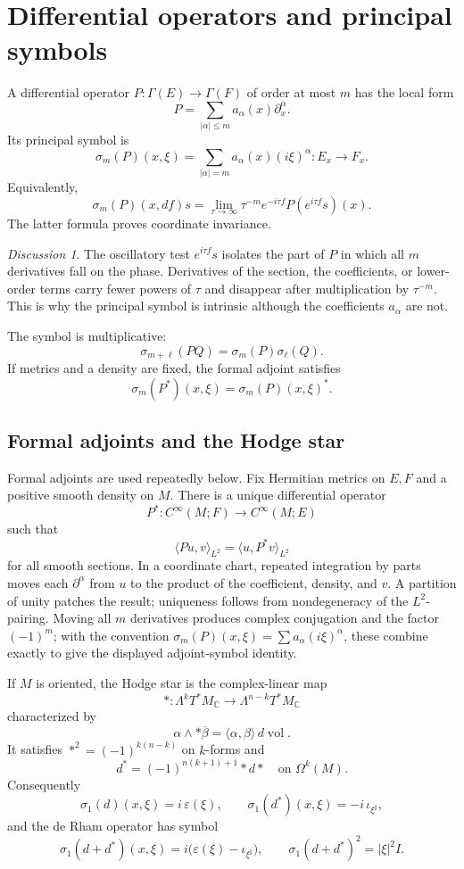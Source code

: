 \documentclass[11pt,oneside,reqno]{book}
\theoremstyle{plain}
\theoremstyle{definition}
\theoremstyle{remark}
\newtheorem*{discussion}{Discussion}
\begin{document}
\section{Differential operators and principal symbols}

A differential operator \(P:\Gamma(E)\to\Gamma(F)\) of order at most \(m\)
has the local form
\[
 P=\sum_{|\alpha|\leq m}a_\alpha(x)\partial_x^\alpha.
\]
Its principal symbol is
\[
 \sigma_m(P)(x,\xi)
 =
 \sum_{|\alpha|=m}a_\alpha(x)(i\xi)^\alpha:
 E_x\longrightarrow F_x.
\]
Equivalently,
\[
 \sigma_m(P)(x,df)s
 =
 \lim_{\tau\to\infty}
 \tau^{-m}e^{-i\tau f}P(e^{i\tau f}s)(x).
\]
The latter formula proves coordinate invariance.

\begin{discussion}
The oscillatory test \(e^{i\tau f}s\) isolates the part of \(P\) in which
all \(m\) derivatives fall on the phase. Derivatives of the section, the
coefficients, or lower-order terms carry fewer powers of \(\tau\) and
disappear after multiplication by \(\tau^{-m}\). This is why the principal
symbol is intrinsic although the coefficients \(a_\alpha\) are not.
\end{discussion}

The symbol is multiplicative:
\[
 \sigma_{m+\ell}(PQ)
 =
 \sigma_m(P)\sigma_\ell(Q).
\]
If metrics and a density are fixed, the formal adjoint satisfies
\[
 \sigma_m(P^*)(x,\xi)=\sigma_m(P)(x,\xi)^*.
\]

\subsection*{Formal adjoints and the Hodge star}

Formal adjoints are used repeatedly below.  Fix
Hermitian metrics on \(E,F\) and a positive smooth density on \(M\).
There is a unique differential operator
\[
 P^*:C^\infty(M;F)\longrightarrow C^\infty(M;E)
\]
such that
\[
 \langle Pu,v\rangle_{L^2}=\langle u,P^*v\rangle_{L^2}
\]
for all smooth sections.  In a coordinate chart, repeated integration by
parts moves each \(\partial^\alpha\) from \(u\) to the product of the
coefficient, density, and \(v\).  A partition of unity patches the result;
uniqueness follows from nondegeneracy of the \(L^2\)-pairing.  Moving all
\(m\) derivatives produces complex conjugation and the factor
\((-1)^m\); with the convention
\(\sigma_m(P)(x,\xi)=\sum a_\alpha(i\xi)^\alpha\), these combine exactly
to give the displayed adjoint-symbol identity.

If \(M\) is oriented, the Hodge star is the complex-linear map
\[
 *:\Lambda^kT^*M_\mathbb C\longrightarrow
   \Lambda^{n-k}T^*M_\mathbb C
\]
characterized by
\[
 \alpha\wedge *\overline\beta
 =\langle\alpha,\beta\rangle\,d\operatorname{vol}.
\]
It satisfies \(*^2=(-1)^{k(n-k)}\) on \(k\)-forms and
\begin{equation}\label{eq:dstar}
 d^*=(-1)^{n(k+1)+1}*d*
 \quad\text{on }\Omega^{k}(M).
\end{equation}
Consequently
\[
 \sigma_1(d)(x,\xi)=i\,\varepsilon(\xi),
 \qquad
 \sigma_1(d^*)(x,\xi)=-i\,\iota_{\xi^\sharp},
\]
and the de Rham operator has symbol
\[
 \sigma_1(d+d^*)(x,\xi)
 =i\bigl(\varepsilon(\xi)-\iota_{\xi^\sharp}\bigr),
 \qquad
 \sigma_1(d+d^*)^2=|\xi|^2I.
\]
\end{document}
